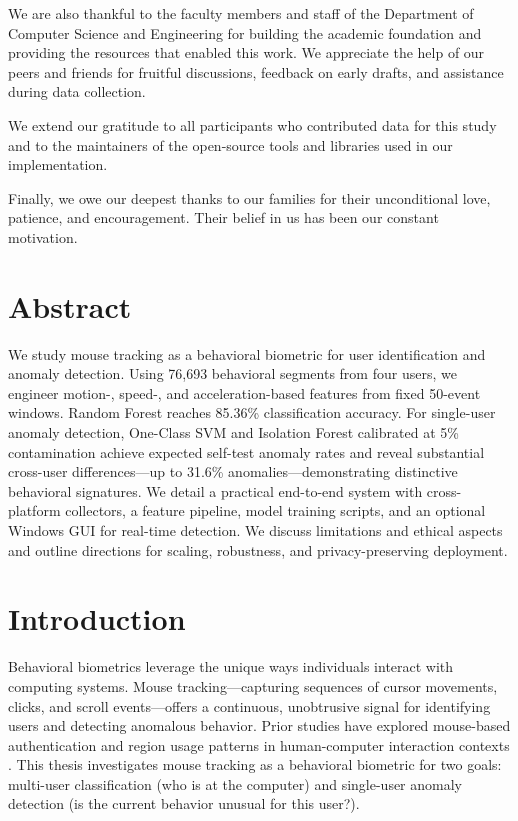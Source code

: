 \documentclass[
  12pt,
]{article}
\begin{document}
We are also thankful to the faculty members and staff of the Department
of Computer Science and Engineering for building the academic foundation
and providing the resources that enabled this work. We appreciate the
help of our peers and friends for fruitful discussions, feedback on
early drafts, and assistance during data collection.

We extend our gratitude to all participants who contributed data for
this study and to the maintainers of the open-source tools and libraries
used in our implementation.

Finally, we owe our deepest thanks to our families for their
unconditional love, patience, and encouragement. Their belief in us has
been our constant motivation.

\newpage

\section{Abstract}\label{abstract}

We study mouse tracking as a behavioral biometric for user
identification and anomaly detection. Using 76,693 behavioral segments
from four users, we engineer motion-, speed-, and acceleration-based
features from fixed 50-event windows. Random Forest reaches 85.36\%
classification accuracy. For single-user anomaly detection, One-Class
SVM and Isolation Forest calibrated at 5\% contamination achieve
expected self-test anomaly rates and reveal substantial cross-user
differences---up to 31.6\% anomalies---demonstrating distinctive
behavioral signatures. We detail a practical end-to-end system with
cross-platform collectors, a feature pipeline, model training scripts,
and an optional Windows GUI for real-time detection. We discuss
limitations and ethical aspects and outline directions for scaling,
robustness, and privacy-preserving deployment.

\section{Introduction}\label{introduction}

Behavioral biometrics leverage the unique ways individuals interact with
computing systems. Mouse tracking---capturing sequences of cursor
movements, clicks, and scroll events---offers a continuous, unobtrusive
signal for identifying users and detecting anomalous behavior. Prior
studies have explored mouse-based authentication and region usage
patterns in human-computer interaction contexts \cite{rahman2021}. This
thesis investigates mouse tracking as a behavioral biometric for two
goals: multi-user classification (who is at the computer) and
single-user anomaly detection (is the current behavior unusual for this
user?).
\end{document}
